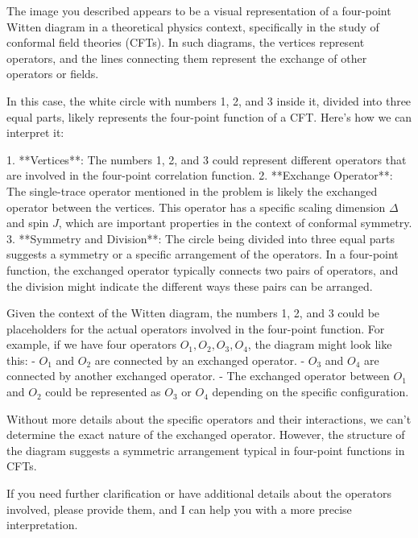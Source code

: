 The image you described appears to be a visual representation of a four-point Witten diagram in a theoretical physics context, specifically in the study of conformal field theories (CFTs). In such diagrams, the vertices represent operators, and the lines connecting them represent the exchange of other operators or fields.

In this case, the white circle with numbers 1, 2, and 3 inside it, divided into three equal parts, likely represents the four-point function of a CFT. Here's how we can interpret it:

1. **Vertices**: The numbers 1, 2, and 3 could represent different operators that are involved in the four-point correlation function.
2. **Exchange Operator**: The single-trace operator mentioned in the problem is likely the exchanged operator between the vertices. This operator has a specific scaling dimension \( \Delta \) and spin \( J \), which are important properties in the context of conformal symmetry.
3. **Symmetry and Division**: The circle being divided into three equal parts suggests a symmetry or a specific arrangement of the operators. In a four-point function, the exchanged operator typically connects two pairs of operators, and the division might indicate the different ways these pairs can be arranged.

Given the context of the Witten diagram, the numbers 1, 2, and 3 could be placeholders for the actual operators involved in the four-point function. For example, if we have four operators \( O_1, O_2, O_3, O_4 \), the diagram might look like this:
- \( O_1 \) and \( O_2 \) are connected by an exchanged operator.
- \( O_3 \) and \( O_4 \) are connected by another exchanged operator.
- The exchanged operator between \( O_1 \) and \( O_2 \) could be represented as \( O_3 \) or \( O_4 \) depending on the specific configuration.

Without more details about the specific operators and their interactions, we can't determine the exact nature of the exchanged operator. However, the structure of the diagram suggests a symmetric arrangement typical in four-point functions in CFTs.

If you need further clarification or have additional details about the operators involved, please provide them, and I can help you with a more precise interpretation.